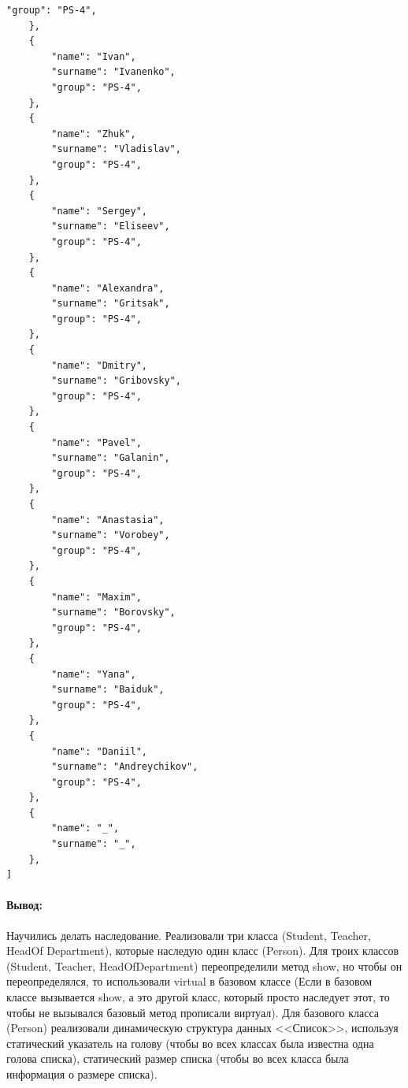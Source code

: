 \begin{lstlisting}[language=Out,]
        "group": "PS-4",
    },
    {
        "name": "Ivan",
        "surname": "Ivanenko",
        "group": "PS-4",
    },
    {
        "name": "Zhuk",
        "surname": "Vladislav",
        "group": "PS-4",
    },
    {
        "name": "Sergey",
        "surname": "Eliseev",
        "group": "PS-4",
    },
    {
        "name": "Alexandra",
        "surname": "Gritsak",
        "group": "PS-4",
    },
    {
        "name": "Dmitry",
        "surname": "Gribovsky",
        "group": "PS-4",
    },
    {
        "name": "Pavel",
        "surname": "Galanin",
        "group": "PS-4",
    },
    {
        "name": "Anastasia",
        "surname": "Vorobey",
        "group": "PS-4",
    },
    {
        "name": "Maxim",
        "surname": "Borovsky",
        "group": "PS-4",
    },
    {
        "name": "Yana",
        "surname": "Baiduk",
        "group": "PS-4",
    },
    {
        "name": "Daniil",
        "surname": "Andreychikov",
        "group": "PS-4",
    },
    {
        "name": "_",
        "surname": "_",
    },
]       
\end{lstlisting}

\paragraph{Вывод:}
Научились делать наследование.
Реализовали три класса (Student, Teacher, HeadOf Department), которые наследую один класс (Person).
Для троих классов (Student, Teacher, HeadOfDepartment) переопределили метод show, но чтобы он переопределялся, то использовали virtual в базовом классе (Если в базовом классе вызывается show, а это другой класс, который просто наследует этот, то чтобы не вызывался базовый метод прописали виртуал).
Для базового класса (Person) реализовали динамическую структура данных <<Список>>, используя статический указатель на голову (чтобы во всех классах была известна одна голова списка), статический размер списка (чтобы во всех класса была информация о размере списка).